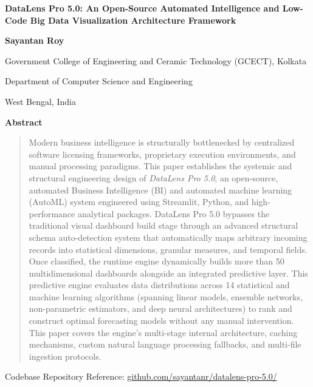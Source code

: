 \documentclass[11pt,a4paper,titlepage]{article}
\begin{document}
\begin{titlepage}
    \centering
    \vspace*{2cm}
    {\LARGE\bfseries DataLens Pro 5.0: An Open-Source Automated Intelligence and Low-Code Big Data Visualization Architecture Framework\par}
    \vspace{1.5cm}
    {\large\bfseries Sayantan Roy}\par
    \vspace{0.5cm}
    {\large Government College of Engineering and Ceramic Technology (GCECT), Kolkata}\par
    {\large Department of Computer Science and Engineering}\par
    {\large West Bengal, India}\par
    \vspace{1.5cm}
    \textbf{Abstract} \\
    \begin{quote}
    Modern business intelligence is structurally bottlenecked by centralized software licensing frameworks, proprietary execution environments, and manual processing paradigms. This paper establishes the systemic and structural engineering design of \textit{DataLens Pro 5.0}, an open-source, automated Business Intelligence (BI) and automated machine learning (AutoML) system engineered using Streamlit, Python, and high-performance analytical packages. DataLens Pro 5.0 bypasses the traditional visual dashboard build stage through an advanced structural schema auto-detection system that automatically maps arbitrary incoming records into statistical dimensions, granular measures, and temporal fields. Once classified, the runtime engine dynamically builds more than 50 multidimensional dashboards alongside an integrated predictive layer. This predictive engine evaluates data distributions across 14 statistical and machine learning algorithms (spanning linear models, ensemble networks, non-parametric estimators, and deep neural architectures) to rank and construct optimal forecasting models without any manual intervention. This paper covers the engine's multi-stage internal architecture, caching mechanisms, custom natural language processing fallbacks, and multi-file ingestion protocols.
    \end{quote}
    \vfill
    {\large Codebase Repository Reference: \href{https://github.com/sayantanr/datalens-pro-5.0/}{github.com/sayantanr/datalens-pro-5.0/}\par}
    \vspace*{1cm}
\end{titlepage}
\end{document}
